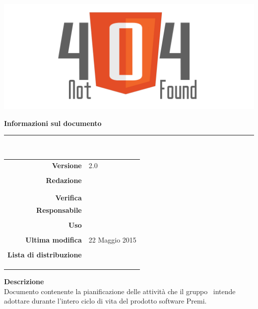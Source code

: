\thispagestyle{empty}

\begin{titlepage}
	
	\begin{center}
	\begin{Huge}
		\textbf{\gruppo} \\
	\end{Huge}
	\vspace{0.5cm}
	\begin{Large}
		\textbf{\capitolato}
	\end{Large}
	
	\vspace{1cm}
    
	\includegraphics[scale=0.35]{../logo/logo404_Extends.png}
	\vspace{1cm}
	\begin{Huge}
		\textbf{\titDoc}
	\end{Huge}
	
	\vspace{1cm}
	\textbf{Informazioni sul documento}\\
    \rule{10cm}{.4pt} \\
	\begin{table}[h]
	\begin{center}
	\begin{tabular}{r | l}
		\textbf{Versione} & 2.0 \\ \\
		\textbf{Redazione} & \MaMo \\
			& \GoIs \\ \\
		\textbf{Verifica} &\VeFe \\
		\textbf{Responsabile} & \GoIs \\ \\
		\textbf{Uso} & \uso \\ \\
		\textbf{Ultima modifica} & 22 Maggio 2015 \\ \\
		\textbf{Lista di distribuzione} & \gruppo \\ 
					& \Vardanega \\
					& \Cardin \\
					& \Zucchetti \\
	\end{tabular}
	\end{center}
	\end{table}
			\textbf{Descrizione} \\
Documento contenente la pianificazione delle attività che il gruppo \gruppo\ intende adottare durante l'intero ciclo di vita del prodotto software Premi.
	\end{center}
\end{titlepage}